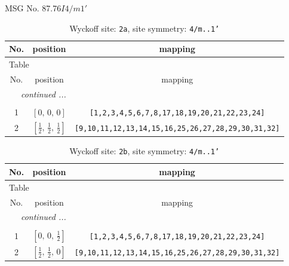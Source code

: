 \documentclass[fleqn,8pt]{jsarticle}
\begin{document}
\setcounter{MaxMatrixCols}{32}

\renewcommand{\tablename}{Table~}
\renewcommand{\figurename}{Figure~}
\begin{center}
\LARGE
MSG No. 87.76\quad$I4/m1'$
\end{center}
\renewcommand{\arraystretch}{1.2}
\begin{longtable}{ccc}
\caption{Wyckoff site: {\tt 2a}, site symmetry: {\tt 4/m..1'}}
 \\
 \hline \hline
No. & position & mapping \\ \hline \endfirsthead

\multicolumn{2}{l}{\tablename\ \thetable{}} \\
 \hline \hline
No. & position & mapping \\ \hline \endhead

 \hline \hline
\multicolumn{2}{r}{\footnotesize\it continued ...} \\ \endfoot

 \hline \hline
\multicolumn{2}{r}{} \\ \endlastfoot

1 & $\left[ 0,\, 0,\, 0 \right]$ & {\tt [1,2,3,4,5,6,7,8,17,18,19,20,21,22,23,24]} \\ \hline
2 & $\left[ \frac{1}{2},\, \frac{1}{2},\, \frac{1}{2} \right]$ & {\tt [9,10,11,12,13,14,15,16,25,26,27,28,29,30,31,32]} \\
\end{longtable}
\renewcommand{\arraystretch}{1.2}
\begin{longtable}{ccc}
\caption{Wyckoff site: {\tt 2b}, site symmetry: {\tt 4/m..1'}}
 \\
 \hline \hline
No. & position & mapping \\ \hline \endfirsthead

\multicolumn{2}{l}{\tablename\ \thetable{}} \\
 \hline \hline
No. & position & mapping \\ \hline \endhead

 \hline \hline
\multicolumn{2}{r}{\footnotesize\it continued ...} \\ \endfoot

 \hline \hline
\multicolumn{2}{r}{} \\ \endlastfoot

1 & $\left[ 0,\, 0,\, \frac{1}{2} \right]$ & {\tt [1,2,3,4,5,6,7,8,17,18,19,20,21,22,23,24]} \\ \hline
2 & $\left[ \frac{1}{2},\, \frac{1}{2},\, 0 \right]$ & {\tt [9,10,11,12,13,14,15,16,25,26,27,28,29,30,31,32]} \\
\end{longtable}
\end{document}
